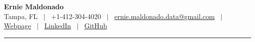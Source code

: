 	\begin{center}
	{\Huge \bfseries Ernie Maldonado} \\ \vspace{6pt}
	\small Tampa, FL ~$|$~ +1-412-304-4020 ~$|$~
	\href{mailto:ernie.maldonado.data@gmail.com}{ernie.maldonado.data@gmail.com} ~$|$~
	\href{https://hernanmaldonado.github.io}{Webpage} ~$|$~
	\href{https://www.linkedin.com/in/erniemaldonado-excellence}{LinkedIn} ~$|$~
	\href{https://github.com/hernanmaldonado/}{GitHub}
	\vspace{-6pt}
	\\ \color{AccentColor}\rule{\linewidth}{0.6pt}
\end{center}
